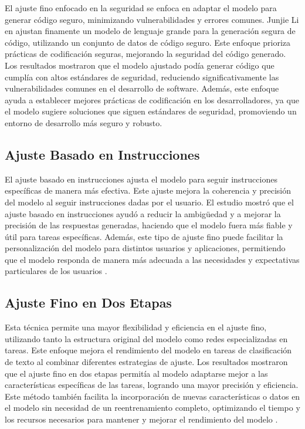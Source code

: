 El ajuste fino enfocado en la seguridad se enfoca en adaptar el modelo para generar código seguro, minimizando vulnerabilidades y errores comunes. Junjie Li en \cite{JLi2024}  ajustan finamente un modelo de lenguaje grande para la generación segura de código, utilizando un conjunto de datos de código seguro. Este enfoque prioriza prácticas de codificación seguras, mejorando la seguridad del código generado. Los resultados mostraron que el modelo ajustado podía generar código que cumplía con altos estándares de seguridad, reduciendo significativamente las vulnerabilidades comunes en el desarrollo de software. Además, este enfoque ayuda a establecer mejores prácticas de codificación en los desarrolladores, ya que el modelo sugiere soluciones que siguen estándares de seguridad, promoviendo un entorno de desarrollo más seguro y robusto.

\subsection{Ajuste Basado en Instrucciones}

El ajuste basado en instrucciones ajusta el modelo para seguir instrucciones específicas de manera más efectiva. Este ajuste mejora la coherencia y precisión del modelo al seguir instrucciones dadas por el usuario. El estudio mostró que el ajuste basado en instrucciones ayudó a reducir la ambigüedad y a mejorar la precisión de las respuestas generadas, haciendo que el modelo fuera más fiable y útil para tareas específicas. Además, este tipo de ajuste fino puede facilitar la personalización del modelo para distintos usuarios y aplicaciones, permitiendo que el modelo responda de manera más adecuada a las necesidades y expectativas particulares de los usuarios \cite{Liesenfeld2023}.

\subsection{Ajuste Fino en Dos Etapas}

 Esta técnica permite una mayor flexibilidad y eficiencia en el ajuste fino, utilizando tanto la estructura original del modelo como redes especializadas en tareas. Este enfoque mejora el rendimiento del modelo en tareas de clasificación de texto al combinar diferentes estrategias de ajuste. Los resultados mostraron que el ajuste fino en dos etapas permitía al modelo adaptarse mejor a las características específicas de las tareas, logrando una mayor precisión y eficiencia. Este método también facilita la incorporación de nuevas características o datos en el modelo sin necesidad de un reentrenamiento completo, optimizando el tiempo y los recursos necesarios para mantener y mejorar el rendimiento del modelo \cite{Zhang2021}.

